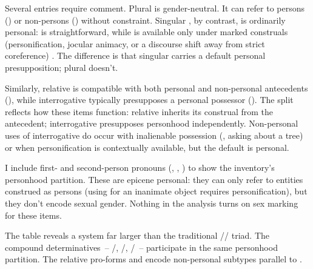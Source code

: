Several entries require comment. Plural  is gender-neutral. It can refer to persons () or non-persons () without constraint. Singular , by contrast, is ordinarily personal:  is straightforward, while  is available only under marked construals (personification, jocular animacy, or a discourse shift away from strict coreference) \autocite{bjorkman2017,konnellycowper2020}. The difference is that singular  carries a default personal presupposition; plural  doesn't.

Similarly, relative  is compatible with both personal and non-personal antecedents (), while interrogative  typically presupposes a personal possessor (). The split reflects how these items function: relative  inherits its construal from the antecedent; interrogative  presupposes personhood independently. Non-personal uses of interrogative  do occur with inalienable possession (, asking about a tree) or when personification is contextually available, but the default is personal.

I include first- and second-person pronouns (, , ) to show the inventory's personhood partition. These are epicene personal: they can only refer to entities construed as persons (using  for an inanimate object requires personification), but they don't encode sexual gender. Nothing in the analysis turns on sex marking for these items.

The table reveals a system far larger than the traditional // triad. The compound determinatives~-- /, /, /~-- participate in the same personhood partition. The relative pro-forms  and  encode non-personal subtypes parallel to .

